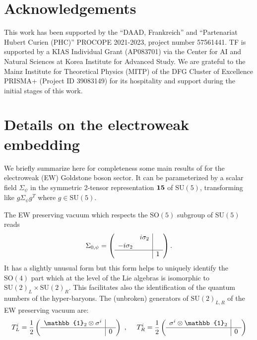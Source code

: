 \documentclass[preprintnumbers,nofootinbib,showpacs,eqsecnum,pre,12pt]{revtex4-1}
\newcommand{\SO}{\text{SO}}
\newcommand{\SU}{\text{SU}}
\newcommand{\id}{\mathbb{1}}
\begin{document}
\section*{Acknowledgements}

This work has been supported by the ``DAAD, Frankreich'' and ``Partenariat Hubert Curien (PHC)'' PROCOPE 2021-2023, project number 57561441. 
TF is supported by a KIAS Individual Grant (AP083701) via the Center for AI and Natural Sciences at Korea Institute for Advanced Study.
We are grateful to the Mainz Institute for Theoretical Physics (MITP) of the DFG
Cluster of Excellence PRISMA+ (Project ID 39083149) for its hospitality and support
during the initial stages of this work.

\appendix

\section{Details on the electroweak embedding}
\label{app:ew_pngbs}
We briefly summarize here for completeness some main results of \cite{Agugliaro:2018vsu} for the electroweak (EW) Goldstone boson sector. It can be parameterized by a scalar field $\Sigma_\psi$ in the symmetric 2-tensor representation $\bf{15}$ of $\SU(5)$, transforming like $g \Sigma_\psi g^T$ where $g\in \SU(5)$.

The EW preserving vacuum which respects the $\SO(5)$ subgroup of $\SU(5)$ reads
\begin{equation}
\Sigma_{0,\psi}= \left(\begin{array} {cc|c}  & i \sigma_2 &   \\ - i \sigma_2 &  & \\\hline  & & 1 \end{array}\right).
\end{equation}
It has a slightly unusual form but this form helps to uniquely identify the
$\SO(4)$ part which at the level of the Lie algebras is isomorphic to 
$\SU(2)_L \times \SU(2)_R$. This facilitates also the identification of the quantum
numbers of the hyper-baryons.
%
The (unbroken) generators of $\SU(2)_{L,R}$ of the EW preserving vacuum
are:
\begin{eqnarray}
T^i_L=\frac {1}{2} \left(\begin{array} {c|c} \id_2 \otimes \sigma^i &  \\\hline   & 0 \end{array}\right) & \,\,\, , \,\,\,&
T^i_R=\frac {1}{2} \left(\begin{array} {c|c} \sigma^i  \otimes \id_2  & \\\hline   & 0 \end{array}\right) 
\end{eqnarray}
\end{document}
